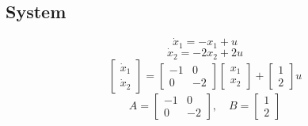 \subsection{System}
$$
\dot{x}_1 = -x_1 + u
$$
$$
\dot{x}_2 = -2x_2 + 2u
$$
$$
\begin{bmatrix}
	\dot{x}_1\\
	\dot{x}_2
\end{bmatrix} = \begin{bmatrix}
-1 & 0\\
0 & -2
\end{bmatrix}\begin{bmatrix}
{x}_1\\
{x}_2
\end{bmatrix} +\begin{bmatrix}
1\\2
\end{bmatrix}u
$$
$$
A = \begin{bmatrix}
	-1 & 0\\
	0 & -2
\end{bmatrix}, \quad B = \begin{bmatrix}
1\\2
\end{bmatrix}
$$
